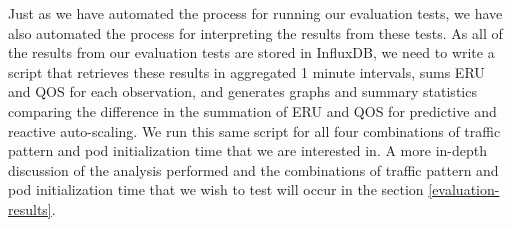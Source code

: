 Just as we have automated the process for running our evaluation tests, we have
also automated the process for interpreting the results from these tests. As all
of the results from our evaluation tests are stored in InfluxDB, we need to
write a script that retrieves these results in aggregated 1 minute intervals,
sums ERU and QOS for each observation, and generates graphs and summary
statistics comparing the difference in the summation of ERU and QOS for
predictive and reactive auto-scaling. We run this same script for all four
combinations of traffic pattern and pod initialization time that we are
interested in. A more in-depth discussion of the analysis performed and the
combinations of traffic pattern and pod initialization time that we wish to test
will occur in the section \ref{evaluation-results}.
